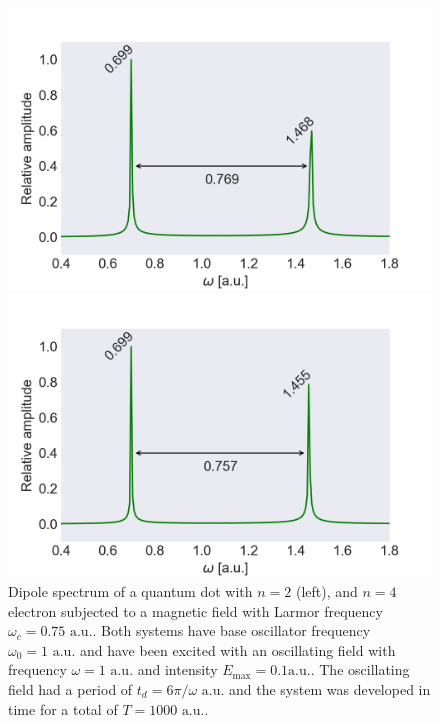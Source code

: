 \begin{figure}[!h]
    \centering
    \begin{minipage}{0.49\textwidth}
        \includegraphics[clip=2em 0em 10em 0em, width=\textwidth]
        {results/figures/B_field/n=2/b_spectrum_omc075.png}
    \end{minipage}\hfill 
    \begin{minipage}{0.49\textwidth}
        \includegraphics[clip=0em 0em 10em 0em, width=\textwidth]
        {results/figures/B_field/n=4/b_spectrum_n=4_omc=075.png}
    \end{minipage}
    \caption{Dipole spectrum of a quantum dot with $n=2$ (left), and $n=4$ electron 
    subjected to a magnetic field with Larmor frequency $\omega_c=0.75 \text{ a.u.}$.
    Both systems have base oscillator frequency $\omega_0=1 \text{ a.u.}$ and 
    have been excited with an oscillating field with frequency $\omega = 1 \text{ a.u.}$
    and intensity $E_\text{max} = 0.1 \text{a.u.}$. The oscillating field had a period of 
    $t_d = 6\pi/\omega \text{ a.u.}$ and the system was developed in time for a total 
    of $T = 1000 \text{ a.u.}$.}
    \label{fig:b_omc075}
\end{figure}


